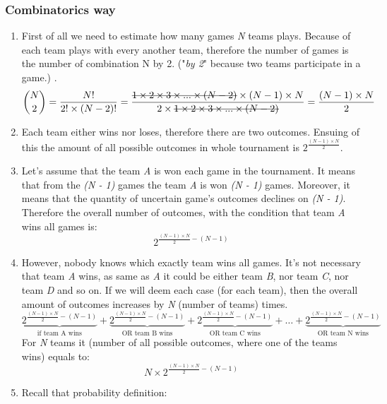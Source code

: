 \documentclass[14pt, a4paper]{extarticle}
\newcommand{\stkout}[1]{\ifmmode\text{\sout{\ensuremath{#1}}}\else\sout{#1}\fi}
\begin{document}
\subsubsection*{Combinatorics way}

\begin{enumerate}
    \item First of all we need to estimate how many games \emph{N} teams plays.
    Because of each team plays with every another team, therefore the number of 
    games is the number of combination N by 2. ("\emph{by 2}" because two 
    teams participate in a game.)
    .
    \[
        \binom{N}{2} = \frac{N!}{2! \times (N - 2)!} = \frac{\stkout{1 \times 2 \times 3 \times ... \times (N - 2)} \times (N - 1) \times N}{2 \times \stkout{1 \times 2 \times 3 \times ... \times (N - 2)}}
    = \frac{(N - 1) \times N}{2}
    \]
    \item Each team either wins nor loses, therefore there are two outcomes.
    Ensuing of this the amount of all possible outcomes in whole tournament is \(2^{\frac{(N - 1) \times N}{2}}\).
    \item Let's assume that the team \emph{A} is won each game in the tournament. 
    It means that from the \emph{(N - 1)} games the team \emph{A} is won \emph{(N - 1)} games. 
    Moreover, it means that the quantity of uncertain game's outcomes declines on \emph{(N - 1)}. 
    Therefore the overall number of outcomes, with the condition that team \emph{A} wins all games is:
    \[
        2^{\frac{(N - 1) \times N}{2} - (N - 1)}
    \]  
    \item However, nobody knows which exactly team wins all games. It's not necessary that team \emph{A} wins,
    as same as \emph{A} it could be either team \emph{B}, nor team \emph{C}, nor team \emph{D} and so on.
    If we will deem each case (for each team), then the overall amount of outcomes increases by \emph{N} (number of teams) times. 
    \[
        \underbrace{2^{\frac{(N - 1) \times N}{2} - (N - 1)}}_\text{if team A wins}
        + \underbrace{2^{\frac{(N - 1) \times N}{2} - (N - 1)}}_\text{OR team B wins}
        + \underbrace{2^{\frac{(N - 1) \times N}{2} - (N - 1)}}_\text{OR team C wins}
        + \dots
        + \underbrace{2^{\frac{(N - 1) \times N}{2} - (N - 1)}}_\text{OR team N wins}
    \]
    For \emph{N} teams it (number of all possible outcomes, where one of the teams wins) equals to:
    \[
        N \times 2^{\frac{(N - 1) \times N}{2} - (N - 1)} 
    \]
    \item Recall that probability definition:


\end{enumerate}
\end{document}
